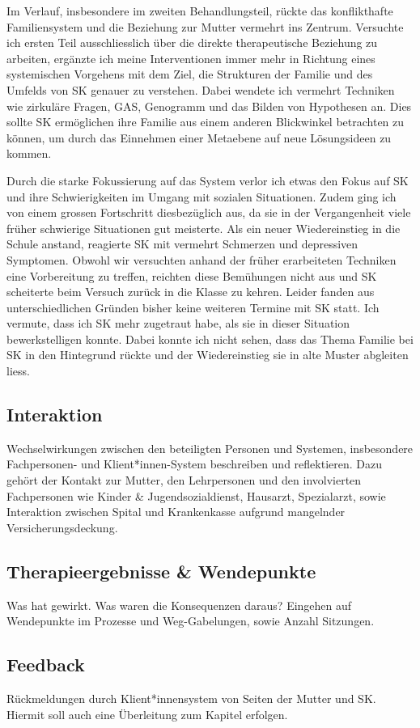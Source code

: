 Im Verlauf, insbesondere im zweiten Behandlungsteil, rückte das konflikthafte Familiensystem und die Beziehung zur Mutter vermehrt ins Zentrum. Versuchte ich ersten Teil ausschliesslich über die direkte therapeutische Beziehung zu arbeiten, ergänzte ich meine Interventionen immer mehr in Richtung eines systemischen Vorgehens mit dem Ziel, die Strukturen der Familie und des Umfelds von SK genauer zu verstehen. Dabei wendete ich vermehrt Techniken wie zirkuläre Fragen, GAS, Genogramm und das Bilden von Hypothesen an. Dies sollte SK ermöglichen ihre Familie aus einem anderen Blickwinkel betrachten zu können, um durch das Einnehmen einer Metaebene auf neue Lösungsideen zu kommen. 

Durch die starke Fokussierung auf das System verlor ich etwas den Fokus auf SK und ihre Schwierigkeiten im Umgang mit sozialen Situationen. Zudem ging ich von einem grossen Fortschritt diesbezüglich aus, da sie in der Vergangenheit viele früher schwierige Situationen gut meisterte. Als ein neuer Wiedereinstieg in die Schule anstand, reagierte SK mit vermehrt Schmerzen und depressiven Symptomen. Obwohl wir versuchten anhand der früher erarbeiteten Techniken eine Vorbereitung zu treffen, reichten diese Bemühungen nicht aus und SK scheiterte beim Versuch zurück in die Klasse zu kehren. Leider fanden aus unterschiedlichen Gründen bisher keine weiteren Termine mit SK statt. Ich vermute, dass ich SK mehr zugetraut habe, als sie in dieser Situation bewerkstelligen konnte. Dabei konnte ich nicht sehen, dass das Thema Familie bei SK in den Hintegrund rückte und der Wiedereinstieg sie in alte Muster abgleiten liess.


\subsection{Interaktion} Wechselwirkungen zwischen den beteiligten Personen und Systemen, insbesondere Fachpersonen- und Klient*innen-System beschreiben und reflektieren. Dazu gehört der Kontakt zur Mutter, den Lehrpersonen und den involvierten Fachpersonen wie Kinder \& Jugendsozialdienst, Hausarzt, Spezialarzt, sowie Interaktion zwischen Spital und Krankenkasse aufgrund mangelnder Versicherungsdeckung.



\subsection{Therapieergebnisse \& Wendepunkte} Was hat gewirkt. Was waren die Konsequenzen daraus? Eingehen auf Wendepunkte im Prozesse und Weg-Gabelungen, sowie Anzahl Sitzungen.




\subsection{Feedback} Rückmeldungen durch Klient*innensystem von Seiten der Mutter und SK. Hiermit soll auch eine Überleitung zum Kapitel  erfolgen.